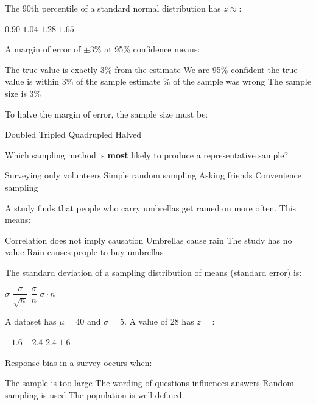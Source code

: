 \documentclass[addpoints]{exam}
\begin{document}
\begin{questions}
\question[1] The 90th percentile of a standard normal distribution has $z \approx$:
\begin{choices}
    \choice $0.90$
    \choice $1.04$
    \correctchoice $1.28$
    \choice $1.65$
\end{choices}

\question[1] A margin of error of $\pm 3\%$ at 95\% confidence means:
\begin{choices}
    \choice The true value is exactly 3\% from the estimate
    \correctchoice We are 95\% confident the true value is within 3\% of the sample estimate
    \% of the sample was wrong
    \choice The sample size is 3\%
\end{choices}

\question[1] To halve the margin of error, the sample size must be:
\begin{choices}
    \choice Doubled
    \choice Tripled
    \correctchoice Quadrupled
    \choice Halved
\end{choices}

\question[1] Which sampling method is \textbf{most} likely to produce a representative sample?
\begin{choices}
    \choice Surveying only volunteers
    \correctchoice Simple random sampling
    \choice Asking friends
    \choice Convenience sampling
\end{choices}

\question[1] A study finds that people who carry umbrellas get rained on more often. This means:
\begin{choices}
    \correctchoice Correlation does not imply causation
    \choice Umbrellas cause rain
    \choice The study has no value
    \choice Rain causes people to buy umbrellas
\end{choices}

\question[1] The standard deviation of a sampling distribution of means (standard error) is:
\begin{choices}
    \choice $\sigma$
    \correctchoice $\dfrac{\sigma}{\sqrt{n}}$
    \choice $\dfrac{\sigma}{n}$
    \choice $\sigma \cdot n$
\end{choices}

\question[1] A dataset has $\mu = 40$ and $\sigma = 5$. A value of 28 has $z =$:
\begin{choices}
    \choice $-1.6$
    \correctchoice $-2.4$
    \choice $2.4$
    \choice $1.6$
\end{choices}

\question[1] Response bias in a survey occurs when:
\begin{choices}
    \choice The sample is too large
    \correctchoice The wording of questions influences answers
    \choice Random sampling is used
    \choice The population is well-defined
\end{choices}



\end{questions}
\end{document}
